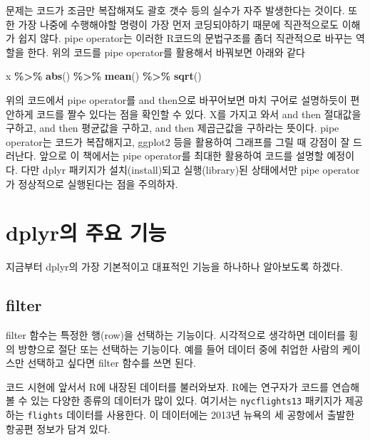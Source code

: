 \documentclass[
]{book}
\newenvironment{Shaded}{\begin{snugshade}}{\end{snugshade}}
\newcommand{\FunctionTok}[1]{\textcolor[rgb]{0.13,0.29,0.53}{\textbf{#1}}}
\newcommand{\NormalTok}[1]{#1}
\newcommand{\SpecialCharTok}[1]{\textcolor[rgb]{0.81,0.36,0.00}{\textbf{#1}}}
\begin{document}
문제는 코드가 조금만 복잡해져도 괄호 갯수 등의 실수가 자주 발생한다는 것이다. 또한 가장 나중에 수행해야할 명령이 가장 먼저 코딩되야하기 때문에 직관적으로도 이해가 쉽지 않다. pipe operator는 이러한 R코드의 문법구조를 좀더 직관적으로 바꾸는 역할을 한다. 위의 코드를 pipe operator를 활용해서 바꿔보면 아래와 같다

\begin{Shaded}
\begin{Highlighting}[]
\NormalTok{x  }\SpecialCharTok{\%\textgreater{}\%} 
  \FunctionTok{abs}\NormalTok{() }\SpecialCharTok{\%\textgreater{}\%} 
  \FunctionTok{mean}\NormalTok{() }\SpecialCharTok{\%\textgreater{}\%} 
  \FunctionTok{sqrt}\NormalTok{()}
\end{Highlighting}
\end{Shaded}

위의 코드에서 pipe operator를 and then으로 바꾸어보면 마치 구어로 설명하듯이 편안하게 코드를 짤수 있다는 점을 확인할 수 있다. X를 가지고 와서 and then 절대값을 구하고, and then 평균값을 구하고, and then 제곱근값을 구하라는 뜻이다. pipe operator는 코드가 복잡해지고, ggplot2 등을 활용하여 그래프를 그릴 때 강점이 잘 드러난다. 앞으로 이 책에서는 pipe operator를 최대한 활용하여 코드를 설명할 예정이다. 다만 dplyr 패키지가 설치(install)되고 실행(library)된 상태에서만 pipe operator가 정상적으로 실행된다는 점을 주의하자.

\section{dplyr의 주요 기능}\label{dplyruxc758-uxc8fcuxc694-uxae30uxb2a5}

지금부터 dplyr의 가장 기본적이고 대표적인 기능을 하나하나 알아보도록 하겠다.

\subsection{filter}\label{filter}

filter 함수는 특정한 행(row)을 선택하는 기능이다. 시각적으로 생각하면 데이터를 횡의 방향으로 절단 또는 선택하는 기능이다. 예를 들어 데이터 중에 취업한 사람의 케이스만 선택하고 싶다면 filter 함수를 쓰면 된다.

코드 시현에 앞서서 R에 내장된 데이터를 불러와보자. R에는 연구자가 코드를 연습해볼 수 있는 다양한 종류의 데이터가 많이 있다. 여기서는 \texttt{nycflights13} 패키지가 제공하는 \texttt{flights} 데이터를 사용한다. 이 데이터에는 2013년 뉴욕의 세 공항에서 출발한 항공편 정보가 담겨 있다.
\end{document}
